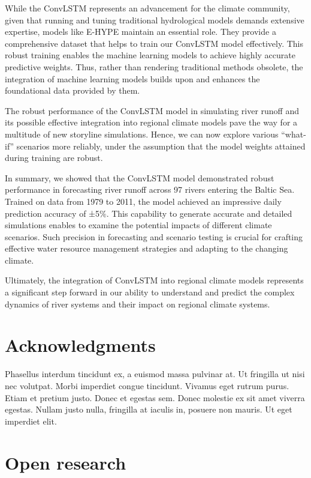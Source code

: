 \documentclass[
]{agujournal2019}
\begin{document}
While the ConvLSTM represents an advancement for the climate community,
given that running and tuning traditional hydrological models demands
extensive expertise, models like E-HYPE maintain an essential role. They
provide a comprehensive dataset that helps to train our ConvLSTM model
effectively. This robust training enables the machine learning models to
achieve highly accurate predictive weights. Thus, rather than rendering
traditional methods obsolete, the integration of machine learning models
builds upon and enhances the foundational data provided by them.

The robust performance of the ConvLSTM model in simulating river runoff
and its possible effective integration into regional climate models pave
the way for a multitude of new storyline simulations. Hence, we can now
explore various ``what-if'' scenarios more reliably, under the
assumption that the model weights attained during training are robust.

In summary, we showed that the ConvLSTM model demonstrated robust
performance in forecasting river runoff across 97 rivers entering the
Baltic Sea. Trained on data from 1979 to 2011, the model achieved an
impressive daily prediction accuracy of ±5\(\%\). This capability to
generate accurate and detailed simulations enables to examine the
potential impacts of different climate scenarios. Such precision in
forecasting and scenario testing is crucial for crafting effective water
resource management strategies and adapting to the changing climate.

Ultimately, the integration of ConvLSTM into regional climate models
represents a significant step forward in our ability to understand and
predict the complex dynamics of river systems and their impact on
regional climate systems.

\hypertarget{acknowledgments}{%
\section{Acknowledgments}\label{acknowledgments}}

Phasellus interdum tincidunt ex, a euismod massa pulvinar at. Ut
fringilla ut nisi nec volutpat. Morbi imperdiet congue tincidunt.
Vivamus eget rutrum purus. Etiam et pretium justo. Donec et egestas sem.
Donec molestie ex sit amet viverra egestas. Nullam justo nulla,
fringilla at iaculis in, posuere non mauris. Ut eget imperdiet elit.

\hypertarget{open-research}{%
\section{Open research}\label{open-research}}
\end{document}
